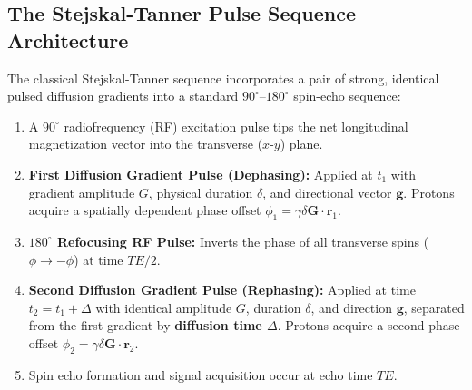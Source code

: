 \documentclass[11pt,a4paper]{article}
\begin{document}
\subsection{The Stejskal-Tanner Pulse Sequence Architecture}

The classical Stejskal-Tanner sequence incorporates a pair of strong, identical pulsed diffusion gradients into a standard $90^\circ\text{--}180^\circ$ spin-echo sequence:
\begin{enumerate}[leftmargin=*]
    \item A $90^\circ$ radiofrequency (RF) excitation pulse tips the net longitudinal magnetization vector into the transverse ($x\text{-}y$) plane.
    \item \textbf{First Diffusion Gradient Pulse (Dephasing):} Applied at $t_1$ with gradient amplitude $G$, physical duration $\delta$, and directional vector $\mathbf{g}$. Protons acquire a spatially dependent phase offset $\phi_1 = \gamma \delta \mathbf{G} \cdot \mathbf{r}_1$.
    \item \textbf{$180^\circ$ Refocusing RF Pulse:} Inverts the phase of all transverse spins ($\phi \to -\phi$) at time $TE / 2$.
    \item \textbf{Second Diffusion Gradient Pulse (Rephasing):} Applied at time $t_2 = t_1 + \Delta$ with identical amplitude $G$, duration $\delta$, and direction $\mathbf{g}$, separated from the first gradient by \textbf{diffusion time $\Delta$}. Protons acquire a second phase offset $\phi_2 = \gamma \delta \mathbf{G} \cdot \mathbf{r}_2$.
    \item Spin echo formation and signal acquisition occur at echo time $TE$.
\end{enumerate}
\end{document}
